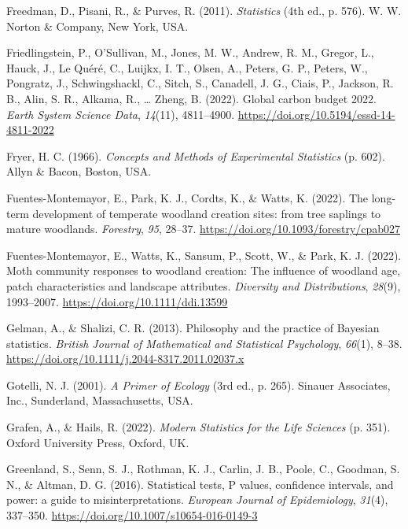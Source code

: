 \documentclass[
  openany]{krantz}
\newlength{\cslhangindent}
\newlength{\cslentryspacingunit} %
\newenvironment{CSLReferences}[2] %
 {%
  \setlength{\parindent}{0pt}
  \ifodd #1
  \let\oldpar\par
  \def\par{\hangindent=\cslhangindent\oldpar}
  \fi
  \setlength{\parskip}{#2\cslentryspacingunit}
 }%
 {}
\begin{document}
\begin{CSLReferences}{1}{0}
\leavevmode{}%
Freedman, D., Pisani, R., \& Purves, R. (2011). \emph{{Statistics}} (4th ed., p. 576). W. W. Norton \& Company, New York, USA.

\leavevmode{}%
Friedlingstein, P., O'Sullivan, M., Jones, M. W., Andrew, R. M., Gregor, L., Hauck, J., Le Quéré, C., Luijkx, I. T., Olsen, A., Peters, G. P., Peters, W., Pongratz, J., Schwingshackl, C., Sitch, S., Canadell, J. G., Ciais, P., Jackson, R. B., Alin, S. R., Alkama, R., \ldots{} Zheng, B. (2022). Global carbon budget 2022. \emph{Earth System Science Data}, \emph{14}(11), 4811--4900. \url{https://doi.org/10.5194/essd-14-4811-2022}

\leavevmode{}%
Fryer, H. C. (1966). \emph{{Concepts and Methods of Experimental Statistics}} (p. 602). Allyn \& Bacon, Boston, USA.

\leavevmode{}%
Fuentes-Montemayor, E., Park, K. J., Cordts, K., \& Watts, K. (2022). {The long-term development of temperate woodland creation sites: from tree saplings to mature woodlands}. \emph{Forestry}, \emph{95}, 28--37. \url{https://doi.org/10.1093/forestry/cpab027}

\leavevmode{}%
Fuentes-Montemayor, E., Watts, K., Sansum, P., Scott, W., \& Park, K. J. (2022). {Moth community responses to woodland creation: The influence of woodland age, patch characteristics and landscape attributes}. \emph{Diversity and Distributions}, \emph{28}(9), 1993--2007. \url{https://doi.org/10.1111/ddi.13599}

\leavevmode{}%
Gelman, A., \& Shalizi, C. R. (2013). {Philosophy and the practice of Bayesian statistics}. \emph{British Journal of Mathematical and Statistical Psychology}, \emph{66}(1), 8--38. \url{https://doi.org/10.1111/j.2044-8317.2011.02037.x}

\leavevmode{}%
Gotelli, N. J. (2001). \emph{{A Primer of Ecology}} (3rd ed., p. 265). Sinauer Associates, Inc., Sunderland, Massachusetts, USA.

\leavevmode{}%
Grafen, A., \& Hails, R. (2022). \emph{{Modern Statistics for the Life Sciences}} (p. 351). Oxford University Press, Oxford, UK.

\leavevmode{}%
Greenland, S., Senn, S. J., Rothman, K. J., Carlin, J. B., Poole, C., Goodman, S. N., \& Altman, D. G. (2016). {Statistical tests, P values, confidence intervals, and power: a guide to misinterpretations}. \emph{European Journal of Epidemiology}, \emph{31}(4), 337--350. \url{https://doi.org/10.1007/s10654-016-0149-3}


\end{CSLReferences}
\end{document}
